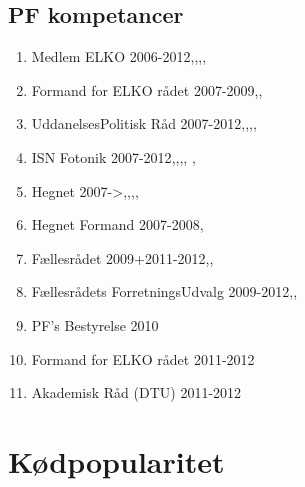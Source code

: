 \subsection{PF kompetancer}
\begin{enumerate}
\item Medlem ELKO 2006-2012\cite{bib:url:Beret2007},\cite{bib:url:Beret2008},\cite{bib:url:Beret2009},\cite{bib:url:Beret2010},\cite{bib:url:Beret2011}
\item Formand for ELKO rådet 2007-2009\cite{bib:url:Beret2007},\cite{bib:url:Beret2008},\cite{bib:url:Beret2009}
\item UddanelsesPolitisk Råd 2007-2012\cite{bib:url:Beret2007},\cite{bib:url:Beret2008},\cite{bib:url:Beret2009},\cite{bib:url:Beret2010},\cite{bib:url:Beret2011}
\item ISN Fotonik 2007-2012\cite{bib:url:Beret2007},\cite{bib:url:Beret2008},\cite{bib:url:Beret2009},\cite{bib:url:Beret2010},\cite{bib:url:Beret2011} , \cite{bib:url:ISNfoto}
\item Hegnet 2007->\cite{bib:url:Beret2007},\cite{bib:url:Beret2008},\cite{bib:url:Beret2009},\cite{bib:url:Beret2010},\cite{bib:url:Beret2011}
\item Hegnet Formand 2007-2008\cite{bib:url:Beret2007},\cite{bib:url:Beret2008}
\item Fællesrådet 2009+2011-2012\cite{bib:url:Beret2009},\cite{bib:url:Beret2010},\cite{bib:url:Beret2011}
\item Fællesrådets ForretningsUdvalg 2009-2012\cite{bib:url:Beret2009},\cite{bib:url:Beret2010},\cite{bib:url:Beret2011}
\item PF's Bestyrelse 2010\cite{bib:url:Beret2010}
\item Formand for ELKO rådet 2011-2012 \cite{bib:url:Beret2011}
\item Akademisk Råd (DTU) 2011-2012\cite{bib:url:Beret2011}
\end{enumerate}

\section{Kødpopularitet}


